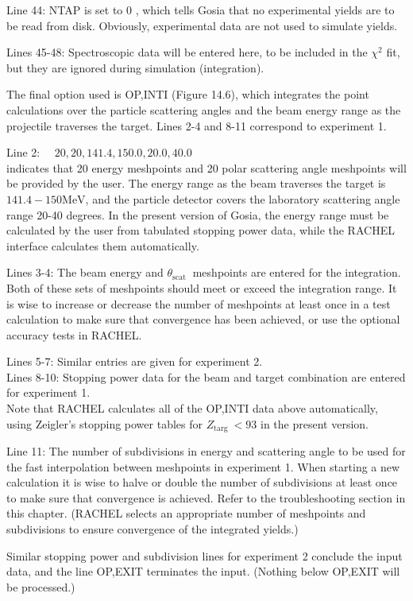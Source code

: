 \documentclass[10pt]{article}
\begin{document}
Line 44: NTAP is set to 0 , which tells Gosia that no experimental yields are to be read from disk. Obviously, experimental data are not used to simulate yields.

Lines 45-48: Spectroscopic data will be entered here, to be included in the $\chi^{2}$ fit, but they are ignored during simulation (integration).

The final option used is OP,INTI (Figure 14.6), which integrates the point calculations over the particle scattering angles and the beam energy range as the projectile traverses the target. Lines 2-4 and 8-11 correspond to experiment 1.

Line 2: $\quad 20,20,141.4,150.0,20.0,40.0$\\
indicates that 20 energy meshpoints and 20 polar scattering angle meshpoints will be provided by the user. The energy range as the beam traverses the target is $141.4-150 \mathrm{MeV}$, and the particle detector covers the laboratory scattering angle range 20-40 degrees. In the present version of Gosia, the energy range must be calculated by the user from tabulated stopping power data, while the RACHEL interface calculates them automatically.

Lines 3-4: The beam energy and $\theta_{\text {scat }}$ meshpoints are entered for the integration. Both of these sets of meshpoints should meet or exceed the integration range. It is wise to increase or decrease the number of meshpoints at least once in a test calculation to make sure that convergence has been achieved, or use the optional accuracy tests in RACHEL.

Lines 5-7: Similar entries are given for experiment 2.\\
Lines 8-10: Stopping power data for the beam and target combination are entered for experiment 1.\\
Note that RACHEL calculates all of the OP,INTI data above automatically, using Zeigler's stopping power tables for $Z_{\text {targ }}<93$ in the present version.

Line 11: The number of subdivisions in energy and scattering angle to be used for the fast interpolation between meshpoints in experiment 1. When starting a new calculation it is wise to halve or double the number of subdivisions at least once to make sure that convergence is achieved. Refer to the troubleshooting section in this chapter. (RACHEL selects an appropriate number of meshpoints and subdivisions to ensure convergence of the integrated yields.)

Similar stopping power and subdivision lines for experiment 2 conclude the input data, and the line OP,EXIT terminates the input. (Nothing below OP,EXIT will be processed.)
\end{document}

